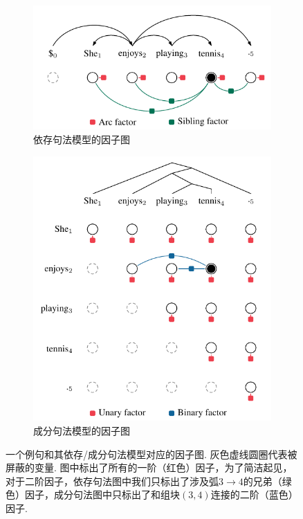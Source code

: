 \begin{figure}[tb]
    \centering
    \begin{subfigure}[b]{0.8\textwidth}
        \centering
        \includegraphics[scale=1]{figures/dep-factors.pdf}
        \caption{依存句法模型的因子图}
        \label{fig:con-factors}
    \end{subfigure}
    \begin{subfigure}[b]{0.8\textwidth}
        \centering
        \includegraphics[scale=1]{figures/con-factors.pdf}
        \caption{成分句法模型的因子图}
        \label{fig:dep-factors}
    \end{subfigure}
    \caption{一个例句和其依存/成分句法模型对应的因子图.
        灰色虚线圆圈代表被屏蔽的变量.
        图中标出了所有的一阶（红色）因子，为了简洁起见，对于二阶因子，依存句法图中我们只标出了涉及弧$3\rightarrow 4$的兄弟（绿色）因子，成分句法图中只标出了和组块$(3, 4)$连接的二阶（蓝色）因子.}
    \label{fig:dep-vi-factors}
\end{figure}


